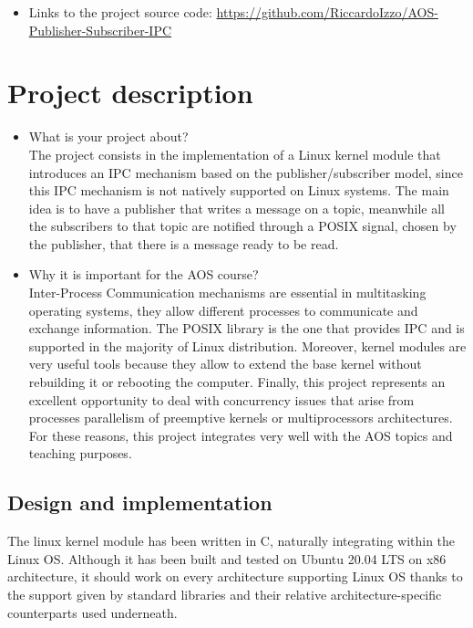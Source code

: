 \documentclass[10pt,a4]{article}
\begin{document}
\begin{itemize}
\item Links to the project source code: \url{https://github.com/RiccardoIzzo/AOS-Publisher-Subscriber-IPC}

\end{itemize}


\section{Project description}

\begin{itemize}
\item What is your project about?\\
The project consists in the implementation of a Linux kernel module that introduces an IPC mechanism based on the publisher/subscriber model, 
since this IPC mechanism is not natively supported on Linux systems.
The main idea is to have a publisher that writes a message on a topic, meanwhile all the subscribers to that topic are notified through a POSIX signal, chosen by the publisher, that there is a message ready to be read.

\item Why it is important for the AOS course?\\
Inter-Process Communication mechanisms are essential in multitasking operating systems, they allow different processes to communicate and exchange information.
The POSIX library is the one that provides IPC and is supported in the majority of Linux distribution.
Moreover, kernel modules are very useful tools because they allow to extend the base kernel without rebuilding it or rebooting the computer.
Finally, this project represents an excellent opportunity to deal with concurrency issues that arise from processes parallelism of preemptive kernels or multiprocessors architectures. For these reasons, this project integrates very well with the AOS topics and teaching purposes.
\end{itemize}

\subsection{Design and implementation}
The linux kernel module has been written in C, naturally integrating within the Linux OS. Although it has been built and tested on Ubuntu 20.04 LTS on x86 architecture, it should work on every architecture supporting Linux OS thanks to the support given by standard libraries and their relative architecture-specific counterparts used underneath.
\end{document}
